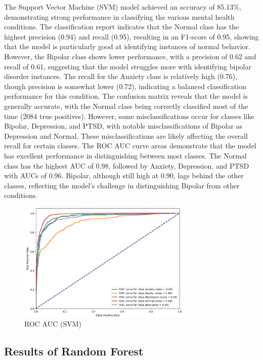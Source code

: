 \noindent
The Support Vector Machine (SVM) model achieved an accuracy of 85.13\%, demonstrating strong performance in classifying the various mental health conditions. The classification report indicates that the Normal class has the highest precision (0.94) and recall (0.95), resulting in an F1-score of 0.95, showing that the model is particularly good at identifying instances of normal behavior. However, the Bipolar class shows lower performance, with a precision of 0.62 and recall of 0.61, suggesting that the model struggles more with identifying bipolar disorder instances. The recall for the Anxiety class is relatively high (0.76), though precision is somewhat lower (0.72), indicating a balanced classification performance for this condition. The confusion matrix reveals that the model is generally accurate, with the Normal class being correctly classified most of the time (2084 true positives). However, some misclassifications occur for classes like Bipolar, Depression, and PTSD, with notable misclassifications of Bipolar as Depression and Normal. These misclassifications are likely affecting the overall recall for certain classes. The ROC AUC curve areas demonstrate that the model has excellent performance in distinguishing between most classes. The Normal class has the highest AUC of 0.98, followed by Anxiety, Depression, and PTSD with AUCs of 0.96. Bipolar, although still high at 0.90, lags behind the other classes, reflecting the model's challenge in distinguishing Bipolar from other conditions.

\begin{figure}[h!]  
    \centering
    \includegraphics[width=0.75\textwidth]{Images/SVM ROC.png}  
    \caption{ROC AUC (SVM)}
    \label{SVMSOC}  %
\end{figure}


\subsection{Results of Random Forest}

